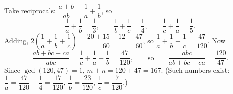 Take reciprocals: $\dfrac{a+b}{ab}=\dfrac{1}{a}+\dfrac{1}{b}$, so
\[
\dfrac{1}{a}+\dfrac{1}{b}=\dfrac{1}{3},\qquad\dfrac{1}{b}+\dfrac{1}{c}=\dfrac{1}{4},\qquad\dfrac{1}{c}+\dfrac{1}{a}=\dfrac{1}{5} .
\]
Adding, $2\left(\dfrac{1}{a}+\dfrac{1}{b}+\dfrac{1}{c}\right)=\dfrac{20+15+12}{60}=\dfrac{47}{60}$, so $\dfrac{1}{a}+\dfrac{1}{b}+\dfrac{1}{c}=\dfrac{47}{120}$. Now
\[
\dfrac{ab+bc+ca}{abc}=\dfrac{1}{c}+\dfrac{1}{a}+\dfrac{1}{b}=\dfrac{47}{120},\qquad\text{so}\qquad\dfrac{abc}{ab+bc+ca}=\dfrac{120}{47}.
\]
Since $\gcd(120,47)=1$, $m+n=120+47=\boxed{167}$. (Such numbers exist: $\dfrac{1}{a}=\dfrac{47}{120}-\dfrac{1}{4}=\dfrac{17}{120}$, $\dfrac{1}{b}=\dfrac{23}{120}$, $\dfrac{1}{c}=\dfrac{7}{120}$.)
